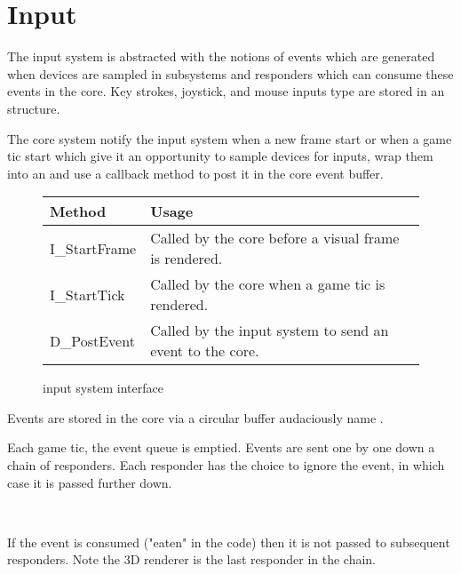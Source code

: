 \section{Input}
The input system is abstracted with the notions of events which are generated when devices are sampled in subsystems and responders which can consume these events in the core. Key strokes, joystick, and mouse inputs type are stored in an  structure.\\
\par
{}
\par
The core system notify the input system when a new frame start or when a game tic start which give it an opportunity to sample devices for inputs, wrap them into an  and use a callback method to post it in the core event buffer.\\
\par
\begin{figure}[H]
\centering  
\begin{tabularx}{\textwidth}{ L{0.6}  L{1.4}}
  \toprule
  \textbf{Method} &  \textbf{Usage}\\
  \toprule 
  I\_StartFrame & Called by the core before a visual frame is rendered.\\
  I\_StartTick & Called by the core when a game tic is rendered.\\
  
  D\_PostEvent & Called by the input system to send an event to the core.\\
   \toprule
\end{tabularx}
\caption{\doom{} input system interface}
\end{figure}
\par
Events are stored in the core via a circular buffer audaciously name .\\
\par
{}

\par
Each game tic, the event queue is emptied. Events are sent one by one down a chain of responders. Each responder has the choice to ignore the event, in which case it is passed further down.\\
\par
{}\\
 \par If the event is consumed ("eaten" in the code) then it is not passed to subsequent responders. Note the 3D renderer is the last responder in the chain.\\
 

